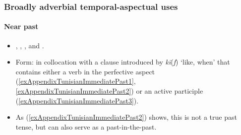 \pagebreak
\subsubsection{Broadly adverbial temporal-aspectual uses}
\paragraph{Near past}\label{appendixTunisianArabicNearPast}
\begin{itemize}
	\item \textcite[259]{Boris1958}, \textcite{FischerEtAlTunisian}, \textcite[1736]{MarcaisGuiga19581961}, \textcite[203]{RittBenmimoun2014} and \textcite[650–651]{Singer1984}.
	\item Form: in collocation with a clause introduced by \mbox{\textit{kī}(\textit{f})} \lq like, when\rq{ }that contains either a verb in the perfective aspect (\ref{exAppendixTunisianImmediatePast1}, \ref{exAppendixTunisianImmediatePast2}) or an active participle (\ref{exAppendixTunisianImmediatePast3}).
	\item As (\ref{exAppendixTunisianImmediatePast2}) shows, this is not a true past tense, but can also serve as a past-in-the-past.
\end{itemize}

